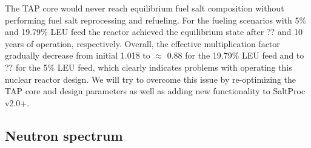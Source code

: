 \documentclass[12pt]{article} %
\begin{document}
The \gls{TAP} core would never reach equilibrium fuel salt composition without 
performing fuel salt reprocessing and refueling. For the fueling scenarios with 
5\% and 19.79\% \gls{LEU} feed the reactor achieved the equilibrium state after 
?? and 10 years of operation, respectively. Overall, the effective multiplication 
factor gradually decrease from initial 1.018 to $\approx$ 0.88 for the 19.79\% 
\gls{LEU} feed and to ?? for the 5\% \gls{LEU} feed, which clearly indicates 
problems with operating this nuclear reactor design. We will try to overcome 
this issue by re-optimizing the \gls{TAP} core and design parameters as well as 
adding new functionality to SaltProc v2.0+.

\subsection{Neutron spectrum}




%


%

\end{document}
